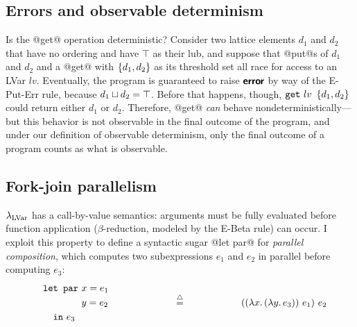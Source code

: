 \subsection{Errors and observable determinism}\label{subsection:lvars-errors-and-observable-determinism}

Is the @get@ operation deterministic?  Consider two lattice elements
$d_1$ and $d_2$ that have no ordering and have $\top$ as their lub,
and suppose that @put@s of $d_1$ and $d_2$ and a @get@ with
$\left\{d_1, d_2\right\}$ as its threshold set all race for access to an LVar
$lv$.  Eventually, the program is guaranteed to raise $\textbf{\textsf{error}}$ by way
of the {\sc E-Put-Err} rule, because $d_1 \sqcup d_2 = \top$.  Before
that happens, though, $\mbox{\texttt{get}}~lv~\left\{d_1, d_2\right\}$ could return
either $d_1$ or $d_2$.  Therefore, @get@ \emph{can} behave
nondeterministically---but this behavior is not observable in the
final outcome of the program, and under our definition of observable
determinism, only the final outcome of a program counts as what is
observable.

\subsection{Fork-join parallelism}\label{subsection:fork-join}

$\lambda_{\textrm{LVar}}$ has a call-by-value semantics: arguments must be fully
evaluated before function application ($\beta$-reduction, modeled by
the {\sc E-Beta} rule) can occur.  I exploit this property to define a
syntactic sugar @let par@ for \emph{parallel composition}, which
computes two subexpressions $e_1$ and $e_2$ in parallel before
computing $e_3$:
\begin{displaymath}
\begin{minipage}[b]{2in}
  \begin{equation*}
\begin{split}
& \LETPAR ~x = e_1 \\ 
& \letparspace ~y = e_2 \\
& \letspace \IN~e_3 
\end{split}
\end{equation*}
\end{minipage}
\begin{minipage}[b]{1in}
\centering
$\defeq$
\end{minipage}
\begin{minipage}[b]{2in}
\begin{equation*}
  \app{(\app{(\lam{x}{(\lam{y}{e_3})})}{e_1})}{e_2}
\end{equation*}
\end{minipage}
\end{displaymath}

